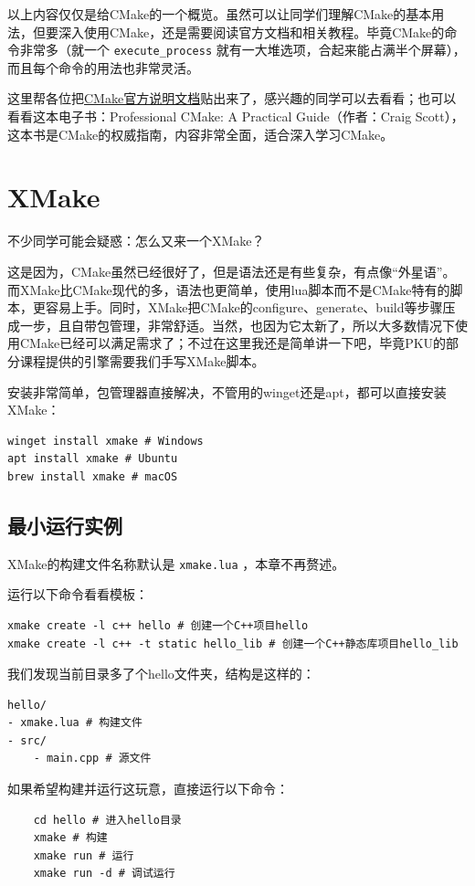 以上内容仅仅是给CMake的一个概览。虽然可以让同学们理解CMake的基本用法，但要深入使用CMake，还是需要阅读官方文档和相关教程。毕竟CMake的命令非常多（就一个 \texttt{execute\_process} 就有一大堆选项，合起来能占满半个屏幕），而且每个命令的用法也非常灵活。

这里帮各位把\href{https://cmake.org/cmake/help/latest/guide/tutorial/}{CMake官方说明文档}贴出来了，感兴趣的同学可以去看看；也可以看看这本电子书：Professional CMake: A Practical Guide（作者：Craig Scott），这本书是CMake的权威指南，内容非常全面，适合深入学习CMake。

\section{XMake}\label{sec:xmake}

不少同学可能会疑惑：怎么又来一个XMake？

这是因为，CMake虽然已经很好了，但是语法还是有些复杂，有点像“外星语”。而XMake比CMake现代的多，语法也更简单，使用lua脚本而不是CMake特有的脚本，更容易上手。同时，XMake把CMake的configure、generate、build等步骤压成一步，且自带包管理，非常舒适。当然，也因为它太新了，所以大多数情况下使用CMake已经可以满足需求了；不过在这里我还是简单讲一下吧，毕竟PKU的部分课程提供的引擎需要我们手写XMake脚本。

安装非常简单，包管理器直接解决，不管用的winget还是apt，都可以直接安装XMake：
\begin{verbatim}
winget install xmake # Windows
apt install xmake # Ubuntu
brew install xmake # macOS
\end{verbatim}

\subsection{最小运行实例}

XMake的构建文件名称默认是 \texttt{xmake.lua} ，本章不再赘述。

运行以下命令看看模板：
\begin{verbatim}
xmake create -l c++ hello # 创建一个C++项目hello
xmake create -l c++ -t static hello_lib # 创建一个C++静态库项目hello_lib
\end{verbatim}

我们发现当前目录多了个hello文件夹，结构是这样的：
\begin{verbatim}
hello/
- xmake.lua # 构建文件
- src/
    - main.cpp # 源文件
\end{verbatim}

如果希望构建并运行这玩意，直接运行以下命令：
\begin{verbatim}
    cd hello # 进入hello目录
    xmake # 构建
    xmake run # 运行
    xmake run -d # 调试运行
\end{verbatim}

